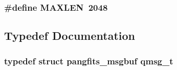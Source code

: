 \subsubsection{\setlength{\rightskip}{0pt plus 5cm}\#define MAXLEN~2048}\label{GU__queue_8h_e6648cd71a8bd49d58ae8ed33ba910d1}




\subsection{Typedef Documentation}
\subsubsection{\setlength{\rightskip}{0pt plus 5cm}typedef struct \bf{pangfits\_\-msgbuf}  \bf{qmsg\_\-t}}\label{GU__queue_8h_6658236f1c5f7deef7c45cc6b55a27c1}



